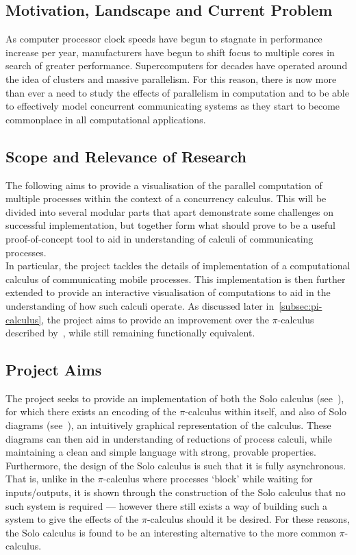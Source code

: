 \subsection{Motivation, Landscape and Current Problem}
    As computer processor clock speeds have begun to stagnate in performance increase per year, manufacturers have begun to shift focus to multiple cores in search of greater performance.
    Supercomputers for decades have operated around the idea of clusters and massive parallelism.
    For this reason, there is now more than ever a need to study the effects of parallelism in computation and to be able to effectively model concurrent communicating systems as they start to become commonplace in all computational applications.


\subsection{Scope and Relevance of Research}
    The following aims to provide a visualisation of the parallel computation of multiple processes within the context of a concurrency calculus.
    This will be divided into several modular parts that apart demonstrate some challenges on successful implementation, but together form what should prove to be a useful proof-of-concept tool to aid in understanding of calculi of communicating processes.\\

    In particular, the project tackles the details of implementation of a computational calculus of communicating mobile processes.
    This implementation is then further extended to provide an interactive visualisation of computations to aid in the understanding of how such calculi operate.
    As discussed later in~\ref{subsec:pi-calculus}, the project aims to provide an improvement over the $\pi$-calculus described by~\cite{pi-calculus}, while still remaining functionally equivalent.


\subsection{Project Aims}
    The project seeks to provide an implementation of both the Solo calculus (see~\cite{solo-calculus}), for which there exists an encoding of the $\pi$-calculus within itself, and also of Solo diagrams (see~\cite{solo-diagrams}), an intuitively graphical representation of the calculus.
    These diagrams can then aid in understanding of reductions of process calculi, while maintaining a clean and simple language with strong, provable properties.
    Furthermore, the design of the Solo calculus is such that it is fully asynchronous.
    That is, unlike in the $\pi$-calculus where processes ‘block’ while waiting for inputs/outputs, it is shown through the construction of the Solo calculus that no such system is required — however there still exists a way of building such a system to give the effects of the $\pi$-calculus should it be desired.
    For these reasons, the Solo calculus is found to be an interesting alternative to the more common $\pi$-calculus.


